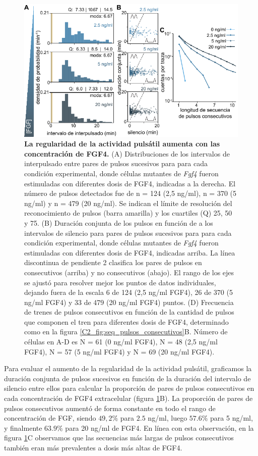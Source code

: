 \documentclass[./main.tex]{subfiles}
\begin{document}
\begin{figure}
    \centering
    \includegraphics[width=1\columnwidth]{figures/chapter3/C3_FGF_consecutive.pdf} \caption{\textbf{La regularidad de la actividad pulsátil aumenta con las concentración de FGF4.} (A) Distribuciones de los intervalos de interpulsado entre pares de pulsos sucesivos para para cada condición experimental, donde células mutantes de \textit{Fgf4} fueron estimuladas con diferentes dosis de FGF4, indicadas a la derecha. El número de pulsos detectados fue de n = 124 (2,5 ng/ml), n = 370 (5 ng/ml) y n = 479 (20 ng/ml). Se indican el límite de resolución del reconocimiento de pulsos (barra amarilla) y los cuartiles (Q) 25, 50 y 75. (B) Duración conjunta de los pulsos en función de a los intervalos de silencio para pares de pulsos sucesivos para para cada condición experimental, donde células mutantes de \textit{Fgf4} fueron estimuladas con diferentes dosis de FGF4, indicadas arriba. La línea discontinua de pendiente 2 clasifica los pares de pulsos en consecutivos (arriba) y no consecutivos (abajo). El rango de los ejes se ajustó para resolver mejor los puntos de datos individuales, dejando fuera de la escala 6 de 124 (2,5 ng/ml FGF4), 26 de 370 (5 ng/ml FGF4) y 33 de 479 (20 ng/ml FGF4) puntos. (D) Frecuencia de trenes de pulsos consecutivos en función de la cantidad de pulsos que componen el tren para diferentes dosis de FGF4, determinado como en la figura \ref{C2_fig:seq_pulsos_consecutivos}B. Número de células en A-D es N = 61 (0 ng/ml FGF4), N = 48 (2,5 ng/ml FGF4), N = 57 (5 ng/ml FGF4) y N = 69 (20 ng/ml FGF4).}
    \label{C3_fig:FGF_consecutive}
\end{figure}
 

Para evaluar el aumento de la regularidad de la actividad pulsátil, graficamos la duración conjunta de pulsos sucesivos en función de la duración del intervalo de silencio entre ellos para calcular la proporción de pares de pulsos consecutivos en cada concentración de FGF4 extracelular (figura \ref{C3_fig:FGF_consecutive}B). La proporción de pares de pulsos consecutivos aumentó de forma constante en todo el rango de concentración de FGF, siendo $49,2 \% $ para $2.5$ ng/ml, luego $57.6\%$ para 5 ng/ml, y finalmente $63.9\%$ para 20 ng/ml de FGF4. En línea con esta observación, en la figura \ref{C3_fig:FGF_consecutive}C observamos que las secuencias más largas de pulsos consecutivos también eran más prevalentes a dosis más altas de FGF4.
\end{document}
